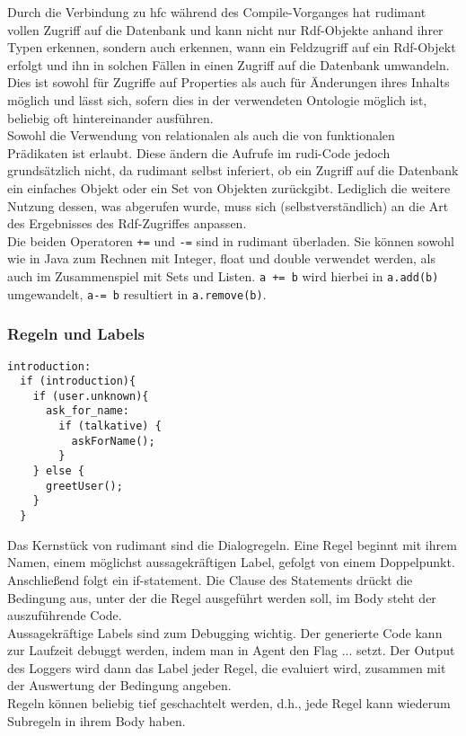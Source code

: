 Durch die Verbindung zu hfc während des Compile-Vorganges hat rudimant vollen Zugriff auf die Datenbank und kann nicht nur Rdf-Objekte anhand ihrer Typen erkennen, sondern auch erkennen, wann ein Feldzugriff auf ein Rdf-Objekt erfolgt und ihn in solchen Fällen in einen Zugriff auf die Datenbank umwandeln. Dies ist sowohl für Zugriffe auf Properties als auch für Änderungen ihres Inhalts möglich und lässt sich, sofern dies in der verwendeten Ontologie möglich ist, beliebig oft hintereinander ausführen.\\
Sowohl die Verwendung von relationalen als auch die von funktionalen Prädikaten ist erlaubt. Diese ändern die Aufrufe im rudi-Code jedoch grundsätzlich nicht, da rudimant selbst inferiert, ob ein Zugriff auf die Datenbank ein einfaches Objekt oder ein Set von Objekten zurückgibt. Lediglich die weitere Nutzung dessen, was abgerufen wurde, muss sich (selbstverständlich) an die Art des Ergebnisses des Rdf-Zugriffes anpassen.\\
Die beiden Operatoren \texttt{+=} und \texttt{-=} sind in rudimant überladen. Sie können sowohl wie in Java zum Rechnen mit Integer, float und double verwendet werden, als auch im Zusammenspiel mit Sets und Listen. \texttt{a += b} wird hierbei in \texttt{a.add(b)} umgewandelt, \texttt{a-= b} resultiert in \texttt{a.remove(b)}.

\subsubsection{Regeln und Labels}

\begin{small}
\begin{verbatim}
introduction:
  if (introduction){
    if (user.unknown){
      ask_for_name:
        if (talkative) {
          askForName();
        }
    } else {
      greetUser();
    }
  }
\end{verbatim}
\end{small}

Das Kernstück von rudimant sind die Dialogregeln. Eine Regel beginnt mit ihrem Namen, einem möglichst aussagekräftigen Label, gefolgt von einem Doppelpunkt. Anschließend folgt ein if-statement. Die Clause des Statements drückt die Bedingung aus, unter der die Regel ausgeführt werden soll, im Body steht der auszuführende Code.\\
Aussagekräftige Labels sind zum Debugging wichtig. Der generierte Code kann zur Laufzeit debuggt werden, indem man in Agent den Flag ... setzt. Der Output des Loggers wird dann das Label jeder Regel, die evaluiert wird, zusammen mit der Auswertung der Bedingung angeben.\\
Regeln können beliebig tief geschachtelt werden, d.h., jede Regel kann wiederum Subregeln in ihrem Body haben.


